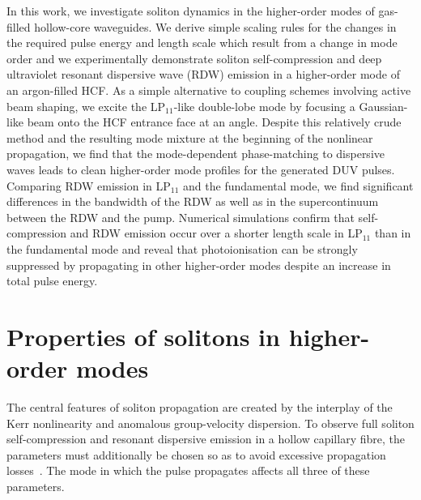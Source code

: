 \documentclass[amsmath, preprint, floatfix]{revtex4-2}
\begin{document}
In this work, we investigate soliton dynamics in the higher-order modes of gas-filled hollow-core waveguides. We derive simple scaling rules for the changes in the required pulse energy and length scale which result from a change in mode order and we experimentally demonstrate soliton self-compression and deep ultraviolet resonant dispersive wave (RDW) emission in a higher-order mode of an argon-filled HCF. As a simple alternative to coupling schemes involving active beam shaping, we excite the LP$_{11}$-like double-lobe mode by focusing a Gaussian-like beam onto the HCF entrance face at an angle. Despite this relatively crude method and the resulting mode mixture at the beginning of the nonlinear propagation, we find that the mode-dependent phase-matching to dispersive waves leads to clean higher-order mode profiles for the generated DUV pulses. Comparing RDW emission in LP$_{11}$ and the fundamental mode, we find significant differences in the bandwidth of the RDW as well as in the supercontinuum between the RDW and the pump. Numerical simulations confirm that self-compression and RDW emission occur over a shorter length scale in LP$_{11}$ than in the fundamental mode and reveal that photoionisation can be strongly suppressed by propagating in other higher-order modes despite an increase in total pulse energy.

\section{Properties of solitons in higher-order modes}
\label{sec:properties}
The central features of soliton propagation are created by the interplay of the Kerr nonlinearity and anomalous group-velocity dispersion. To observe full soliton self-compression and resonant dispersive emission in a hollow capillary fibre, the parameters must additionally be chosen so as to avoid excessive propagation losses~\cite{travers_high-energy_2019}. The mode in which the pulse propagates affects all three of these parameters.
\end{document}
